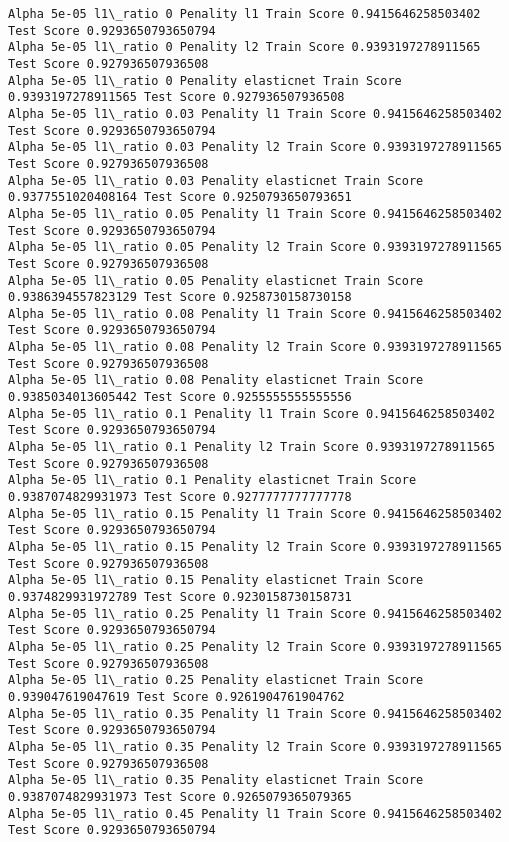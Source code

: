 \documentclass[11pt]{article}
\begin{document}
    \begin{Verbatim}[commandchars=\\\{\}]
Alpha 5e-05 l1\_ratio 0 Penality l1 Train Score 0.9415646258503402 Test Score 0.9293650793650794
Alpha 5e-05 l1\_ratio 0 Penality l2 Train Score 0.9393197278911565 Test Score 0.927936507936508
Alpha 5e-05 l1\_ratio 0 Penality elasticnet Train Score 0.9393197278911565 Test Score 0.927936507936508
Alpha 5e-05 l1\_ratio 0.03 Penality l1 Train Score 0.9415646258503402 Test Score 0.9293650793650794
Alpha 5e-05 l1\_ratio 0.03 Penality l2 Train Score 0.9393197278911565 Test Score 0.927936507936508
Alpha 5e-05 l1\_ratio 0.03 Penality elasticnet Train Score 0.9377551020408164 Test Score 0.9250793650793651
Alpha 5e-05 l1\_ratio 0.05 Penality l1 Train Score 0.9415646258503402 Test Score 0.9293650793650794
Alpha 5e-05 l1\_ratio 0.05 Penality l2 Train Score 0.9393197278911565 Test Score 0.927936507936508
Alpha 5e-05 l1\_ratio 0.05 Penality elasticnet Train Score 0.9386394557823129 Test Score 0.9258730158730158
Alpha 5e-05 l1\_ratio 0.08 Penality l1 Train Score 0.9415646258503402 Test Score 0.9293650793650794
Alpha 5e-05 l1\_ratio 0.08 Penality l2 Train Score 0.9393197278911565 Test Score 0.927936507936508
Alpha 5e-05 l1\_ratio 0.08 Penality elasticnet Train Score 0.9385034013605442 Test Score 0.9255555555555556
Alpha 5e-05 l1\_ratio 0.1 Penality l1 Train Score 0.9415646258503402 Test Score 0.9293650793650794
Alpha 5e-05 l1\_ratio 0.1 Penality l2 Train Score 0.9393197278911565 Test Score 0.927936507936508
Alpha 5e-05 l1\_ratio 0.1 Penality elasticnet Train Score 0.9387074829931973 Test Score 0.9277777777777778
Alpha 5e-05 l1\_ratio 0.15 Penality l1 Train Score 0.9415646258503402 Test Score 0.9293650793650794
Alpha 5e-05 l1\_ratio 0.15 Penality l2 Train Score 0.9393197278911565 Test Score 0.927936507936508
Alpha 5e-05 l1\_ratio 0.15 Penality elasticnet Train Score 0.9374829931972789 Test Score 0.9230158730158731
Alpha 5e-05 l1\_ratio 0.25 Penality l1 Train Score 0.9415646258503402 Test Score 0.9293650793650794
Alpha 5e-05 l1\_ratio 0.25 Penality l2 Train Score 0.9393197278911565 Test Score 0.927936507936508
Alpha 5e-05 l1\_ratio 0.25 Penality elasticnet Train Score 0.939047619047619 Test Score 0.9261904761904762
Alpha 5e-05 l1\_ratio 0.35 Penality l1 Train Score 0.9415646258503402 Test Score 0.9293650793650794
Alpha 5e-05 l1\_ratio 0.35 Penality l2 Train Score 0.9393197278911565 Test Score 0.927936507936508
Alpha 5e-05 l1\_ratio 0.35 Penality elasticnet Train Score 0.9387074829931973 Test Score 0.9265079365079365
Alpha 5e-05 l1\_ratio 0.45 Penality l1 Train Score 0.9415646258503402 Test Score 0.9293650793650794

\end{Verbatim}
\end{document}
